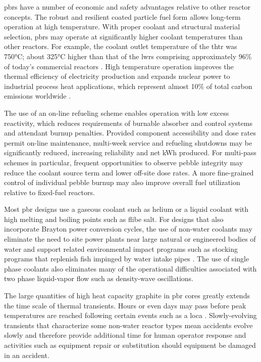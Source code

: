\glspl{pbr} have a number of economic and safety advantages relative to other reactor concepts. The robust and resilient coated particle fuel form allows long-term operation at high temperature. With proper coolant and structural material selection, \glspl{pbr} may operate at significantly higher coolant temperatures than other reactors. For example, the coolant outlet temperature of the \gls{thtr} was 750\si{\celsius}; about 325\si{\celsius} higher than that of the \glspl{lwr} comprising approximately 96\% of today's commercial reactors \cite{reactor_count}. High temperature operation improves the thermal efficiency of electricity production and expands nuclear power to industrial process heat applications, which represent almost 10\% of total carbon emissions worldwide \cite{friedmann}.

The use of an on-line refueling scheme enables operation with low excess reactivity, which reduces requirements of burnable absorber and control systems and attendant burnup penalties. Provided component accessibility and dose rates permit on-line maintenance, multi-week service and refueling shutdowns may be significantly reduced, increasing reliability and net kWh produced. For multi-pass schemes in particular, frequent opportunities to observe pebble integrity may reduce the coolant source term and lower off-site dose rates. A more fine-grained control of individual pebble burnup may also improve overall fuel utilization relative to fixed-fuel reactors.

Most \gls{pbr} designs use a gaseous coolant such as helium or a liquid coolant with high melting and boiling points such as \gls{flibe} salt. For designs that also incorporate Brayton power conversion cycles, the use of non-water coolants may eliminate the need to site power plants near large natural or engineered bodies of water and support related environmental impact programs such as stocking programs that replenish fish impinged by water intake pipes \cite{exelon_fish}. The use of single phase coolants also eliminates many of the operational difficulties associated with two phase liquid-vapor flow such as density-wave oscillations.

The large quantities of high heat capacity graphite in \gls{pbr} cores greatly extends the time scale of thermal transients. Hours or even days may pass before peak temperatures are reached following certain events such as a \gls{loca} \cite{htrpm,tyobeka}. Slowly-evolving transients that characterize some non-water reactor types mean accidents evolve slowly and therefore provide additional time for human operator response and activities such as equipment repair or substitution should equipment be damaged in an accident.

